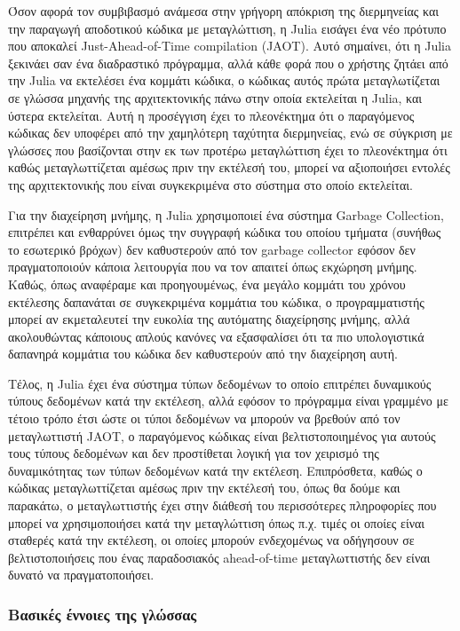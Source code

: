 Όσον αφορά τον συμβιβασμό ανάμεσα στην γρήγορη απόκριση της διερμηνείας και την παραγωγή αποδοτικού κώδικα με μεταγλώττιση, η Julia εισάγει ένα νέο πρότυπο που αποκαλεί Just-Ahead-of-Time compilation (JAOT).
Αυτό σημαίνει, ότι η Julia ξεκινάει σαν ένα διαδραστικό πρόγραμμα, αλλά κάθε φορά που ο χρήστης ζητάει από την Julia να εκτελέσει ένα κομμάτι κώδικα, ο κώδικας αυτός πρώτα μεταγλωτίζεται σε γλώσσα μηχανής της αρχιτεκτονικής πάνω στην οποία εκτελείται η Julia, και ύστερα εκτελείται.
Αυτή η προσέγγιση έχει το πλεονέκτημα ότι ο παραγόμενος κώδικας δεν υποφέρει από την χαμηλότερη ταχύτητα διερμηνείας, ενώ σε σύγκριση με γλώσσες που βασίζονται στην εκ των προτέρω μεταγλώττιση έχει το πλεονέκτημα ότι καθώς μεταγλωττίζεται αμέσως πριν την εκτέλεσή του, μπορεί να αξιοποιήσει εντολές της αρχιτεκτονικής που είναι συγκεκριμένα στο σύστημα στο οποίο εκτελείται.

Για την διαχείρηση μνήμης, η Julia χρησιμοποιεί ένα σύστημα Garbage Collection, επιτρέπει και ενθαρρύνει όμως την συγγραφή κώδικα του οποίου τμήματα (συνήθως το εσωτερικό βρόχων) δεν καθυστερούν από τον garbage collector εφόσον δεν πραγματοποιούν κάποια λειτουργία που να τον απαιτεί όπως εκχώρηση μνήμης.
Καθώς, όπως αναφέραμε και προηγουμένως, ένα μεγάλο κομμάτι του χρόνου εκτέλεσης δαπανάται σε συγκεκριμένα κομμάτια του κώδικα, ο προγραμματιστής μπορεί αν εκμεταλευτεί την ευκολία της αυτόματης διαχείρησης μνήμης, αλλά ακολουθώντας κάποιους απλούς κανόνες να εξασφαλίσει ότι τα πιο υπολογιστικά δαπανηρά κομμάτια του κώδικα δεν καθυστερούν από την διαχείρηση αυτή.

Τέλος, η Julia έχει ένα σύστημα τύπων δεδομένων το οποίο επιτρέπει δυναμικούς τύπους δεδομένων κατά την εκτέλεση, αλλά εφόσον το πρόγραμμα είναι γραμμένο με τέτοιο τρόπο έτσι ώστε οι τύποι δεδομένων να μπορούν να βρεθούν από τον μεταγλωττιστή JAOT, ο παραγόμενος κώδικας είναι βελτιστοποιημένος για αυτούς τους τύπους δεδομένων και δεν προστίθεται λογική για τον χειρισμό της δυναμικότητας των τύπων δεδομένων κατά την εκτέλεση.
Επιπρόσθετα, καθώς ο κώδικας μεταγλωττίζεται αμέσως πριν την εκτέλεσή του, όπως θα δούμε και παρακάτω, ο μεταγλωττιστής έχει στην διάθεσή του περισσότερες πληροφορίες που μπορεί να χρησιμοποιήσει κατά την μεταγλώττιση όπως π.χ. τιμές οι οποίες είναι σταθερές κατά την εκτέλεση, οι οποίες μπορούν ενδεχομένως να οδήγησουν σε βελτιστοποιήσεις που ένας παραδοσιακός ahead-of-time μεταγλωττιστής δεν είναι δυνατό να πραγματοποιήσει.

\subsubsection{Βασικές έννοιες της γλώσσας}

